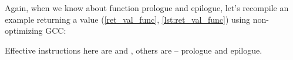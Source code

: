
Again, when we know about function prologue and epilogue, let's recompile an example returning a value
(\ref{ret_val_func}, \ref{lst:ret_val_func}) using non-optimizing GCC:



Effective instructions here are  and , others are -- prologue and epilogue.

